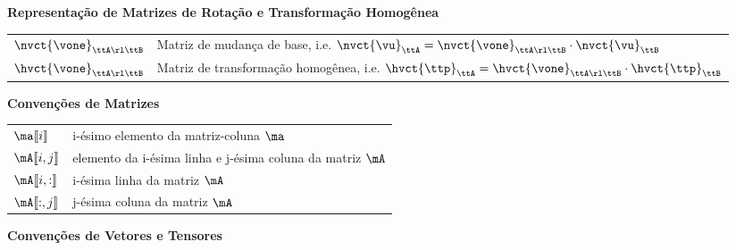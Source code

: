 \documentclass[]{politex}
\begin{document}
\begin{center} \begin{Large} \textbf{Representação de Matrizes de Rotação e Transformação Homogênea} \end{Large} \end{center}
\begin{longtable}{lp{}}
  $\nvct{\vone}_{\ttA \rl \ttB} $ & Matriz de mudança de base, i.e. $\nvct{\vu}_{\ttA} = \nvct{\vone}_{\ttA \rl \ttB} \cdot \nvct{\vu}_{\ttB} $ \\
  $\hvct{\vone}_{\ttA \rl \ttB}$ & Matriz de transformação homogênea, i.e. $\hvct{\ttp}_{\ttA} = \hvct{\vone}_{\ttA \rl \ttB} \cdot \hvct{\ttp}_{\ttB}$ \\
\end{longtable}
\begin{center} \begin{Large} \textbf{Convenções de Matrizes} \end{Large} \end{center}
\begin{longtable}{lp{}}
  $\ma \llbracket i \rrbracket $ & i-ésimo elemento da matriz-coluna $\ma$ \\
  $\mA \llbracket i,j \rrbracket $ & elemento da i-ésima linha e j-ésima coluna da matriz $\mA$ \\
  $\mA \llbracket i,: \rrbracket $ & i-ésima linha da matriz $\mA$ \\
  $\mA \llbracket :,j \rrbracket $ & j-ésima coluna da matriz $\mA$ \\
\end{longtable}
\begin{center} \begin{Large} \textbf{Convenções de Vetores e Tensores} \end{Large} \end{center}
\end{document}
